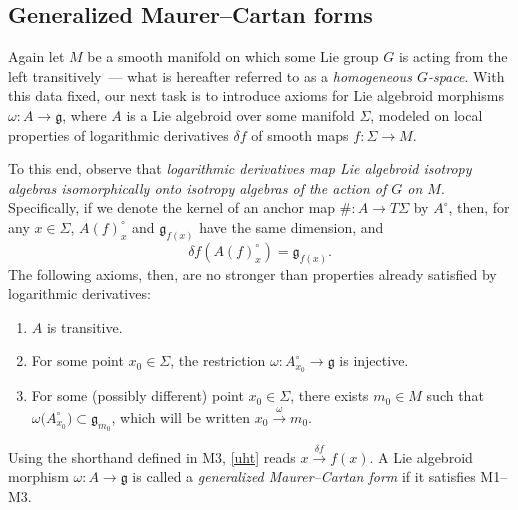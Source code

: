 \subsection*{Generalized Maurer--Cartan forms}%

Again let $M$ be a smooth manifold on which some Lie group $G$ is
acting from the left transitively~--- what is hereafter referred to as
a {\it homogeneous $G$-space}. With this data fixed, our next task is
to introduce axioms for Lie algebroid morphisms
$\omega \colon A \rightarrow {\mathfrak g}$, where $A$ is a Lie
algebroid over some manifold $\Sigma$, modeled on local properties of
logarithmic derivatives $\delta f$ of smooth maps
$f \colon \Sigma \rightarrow M$.

To this end, observe that {\it logarithmic derivatives map Lie
algebroid isotropy algebras isomorphically onto isotropy algebras of
the action of $G$ on $M$}. Specifically, if we denote the kernel of an
anchor map $\#\colon A \rightarrow T \Sigma$ by $A^\circ $, then, for
any $x \in \Sigma$, $A(f )_x^\circ$ and ${\mathfrak g}_{f(x)}$ have the
same dimension, and
\begin{equation}
\delta f(A(f)_x^\circ) = {\mathfrak g}_{f(x)}.
 \label{uht}
\end{equation}
The following axioms, then, are no stronger than
properties already satisfied by logarithmic derivatives:
\begin{enumerate}\itemsep=0pt
\item[M1] $A$ is transitive.
\item[M2] For some point $x_0 \in \Sigma $, the restriction
$\omega \colon A^\circ_{x_0} \rightarrow {\mathfrak g}$ is injective.
\item[M3] For some (possibly different) point $x_0 \in \Sigma $,
there exists $m_0 \in M$ such that $\omega\big(A^\circ_{x_0}\big) \subset
{\mathfrak g}_{m_0}$, which will be written $x_0\xrightarrow{\omega}m_0$.
\end{enumerate}
%
Using the shorthand defined in M3, \eqref{uht} reads $x
\xrightarrow{\delta f} f(x)$. A Lie algebroid morphism $\omega \colon
A \rightarrow {\mathfrak g}$ is called a {\it generalized
Maurer--Cartan form} if it satisfies M1--M3.

